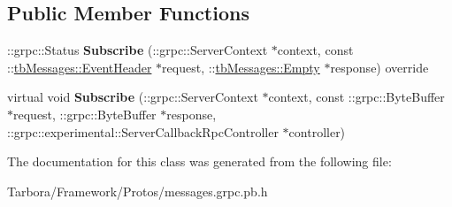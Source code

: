 \subsection*{Public Member Functions}
\begin{DoxyCompactItemize}
\item 
\mbox{\label{classtbMessages_1_1TarboraMessages_1_1ExperimentalWithRawCallbackMethod__Subscribe_ab8d988e5c17710b32c695667e9fba129}} 
\+::grpc\+::\+Status {\bfseries Subscribe} (\+::grpc\+::\+Server\+Context $\ast$context, const \+::\hyperlink{classtbMessages_1_1EventHeader}{tb\+Messages\+::\+Event\+Header} $\ast$request, \+::\hyperlink{classtbMessages_1_1Empty}{tb\+Messages\+::\+Empty} $\ast$response) override
\item 
\mbox{\label{classtbMessages_1_1TarboraMessages_1_1ExperimentalWithRawCallbackMethod__Subscribe_a78d3f1b368c22b71e60ef9f6daae9411}} 
virtual void {\bfseries Subscribe} (\+::grpc\+::\+Server\+Context $\ast$context, const \+::grpc\+::\+Byte\+Buffer $\ast$request, \+::grpc\+::\+Byte\+Buffer $\ast$response, \+::grpc\+::experimental\+::\+Server\+Callback\+Rpc\+Controller $\ast$controller)
\end{DoxyCompactItemize}


The documentation for this class was generated from the following file\+:\begin{DoxyCompactItemize}
\item 
Tarbora/\+Framework/\+Protos/messages.\+grpc.\+pb.\+h\end{DoxyCompactItemize}
